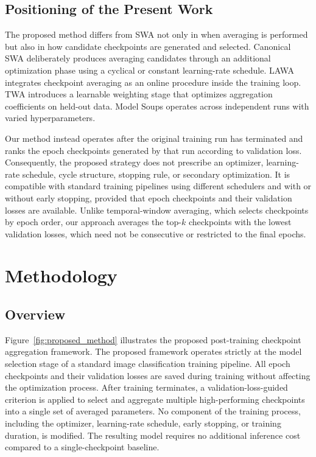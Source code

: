 \documentclass[runningheads]{llncs}
\begin{document}
\subsection{Positioning of the Present Work}

The proposed method differs from SWA not only in when averaging is
performed but also in how candidate checkpoints are generated and
selected.
Canonical SWA deliberately produces averaging candidates through an
additional optimization phase using a cyclical or constant learning-rate
schedule.
LAWA integrates checkpoint averaging as an online procedure inside the
training loop.
TWA introduces a learnable weighting stage that optimizes aggregation
coefficients on held-out data.
Model Soups operates across independent runs with varied hyperparameters.

Our method instead operates after the original training run has terminated
and ranks the epoch checkpoints generated by that run according to
validation loss.
Consequently, the proposed strategy does not prescribe an optimizer,
learning-rate schedule, cycle structure, stopping rule, or secondary
optimization.
It is compatible with standard training pipelines using different
schedulers and with or without early stopping, provided that epoch
checkpoints and their validation losses are available.
Unlike temporal-window averaging, which selects checkpoints by epoch
order, our approach averages the top-$k$ checkpoints with the lowest
validation losses, which need not be consecutive or restricted to the
final epochs.

\FloatBarrier

\section{Methodology}
\label{sec:methodology}

\subsection{Overview}

Figure~\ref{fig:proposed_method} illustrates the proposed post-training checkpoint aggregation framework. The proposed framework operates strictly at the model selection stage of a standard image classification training pipeline. All epoch checkpoints and their validation losses are saved during training without affecting the optimization process. After training terminates, a validation-loss-guided criterion is applied to select and aggregate multiple high-performing checkpoints into a single set of averaged parameters. No component of the training process, including the optimizer, learning-rate schedule, early stopping, or training duration, is modified. The resulting model requires no additional inference cost compared to a single-checkpoint baseline.
\FloatBarrier
\end{document}
